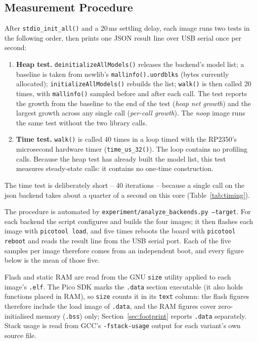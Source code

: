 \documentclass{article}
\begin{document}
\subsection{Measurement Procedure}
\label{sec:procedure}
After \texttt{stdio\_init\_all()} and a 20\,ms settling delay, each image runs two tests in the following order, then prints one JSON result line over USB serial once per second:

\begin{enumerate}
    \item \textbf{Heap test.} \texttt{deinitializeAllModels()} releases the backend's model list; a baseline is taken from newlib's \texttt{mallinfo().uordblks} (bytes currently allocated); \texttt{initializeAllModels()} rebuilds the list; \texttt{walk()} is then called 20 times, with \texttt{mallinfo()} sampled before and after each call. The test reports the growth from the baseline to the end of the test (\textit{heap net growth}) and the largest growth across any single call (\textit{per-call growth}). The \textit{noop} image runs the same test without the two library calls.
    \item \textbf{Time test.} \texttt{walk()} is called 40 times in a loop timed with the RP2350's microsecond hardware timer (\texttt{time\_us\_32()}). The loop contains no profiling calls. Because the heap test has already built the model list, this test measures steady-state calls: it contains no one-time construction.
\end{enumerate}

The time test is deliberately short -- 40 iterations -- because a single call on the json backend takes about a quarter of a second on this core (Table~\ref{tab:timing}).

The procedure is automated by \texttt{experiment/analyze\_backends.py --target}. For each backend the script configures and builds the four images; it then flashes each image with \texttt{picotool load}, and five times reboots the board with \texttt{picotool reboot} and reads the result line from the USB serial port. Each of the five samples per image therefore comes from an independent boot, and every figure below is the mean of those five.

Flash and static RAM are read from the GNU \texttt{size} utility applied to each image's \texttt{.elf}. The Pico SDK marks the \texttt{.data} section executable (it also holds functions placed in RAM), so \texttt{size} counts it in its \texttt{text} column: the flash figures therefore include the load image of \texttt{.data}, and the RAM figures cover zero-initialised memory (\texttt{.bss}) only; Section~\ref{sec:footprint} reports \texttt{.data} separately. Stack usage is read from GCC's \texttt{-fstack-usage} output for each variant's own source file.
\end{document}
